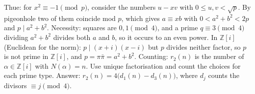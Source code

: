 \documentclass[11pt,a4paper]{article}
\begin{document}
 Thue: for $x^2\equiv-1\pmod p$, consider the numbers $u-xv$ with $0\le u,v<\sqrt p$. By pigeonhole two of them coincide mod $p$, which gives $a\equiv xb$ with $0<a^2+b^2<2p$ and $p\mid a^2+b^2$. Necessity: squares are $0,1\pmod 4$, and a prime $q\equiv3\pmod4$ dividing $a^2+b^2$ divides both $a$ and $b$, so it occurs to an even power.
 In $\mathbb Z[i]$ (Euclidean for the norm): $p\mid(x+i)(x-i)$ but $p$ divides neither factor, so $p$ is not prime in $\mathbb Z[i]$, and $p=\pi\bar\pi=a^2+b^2$.
 Counting: $r_2(n)$ is the number of $\alpha\in\mathbb Z[i]$ with $N(\alpha)=n$. Use unique factorisation and count the choices for each prime type. Answer: $r_2(n)=4\bigl(d_1(n)-d_3(n)\bigr)$, where $d_j$ counts the divisors $\equiv j\pmod4$.
\end{document}
